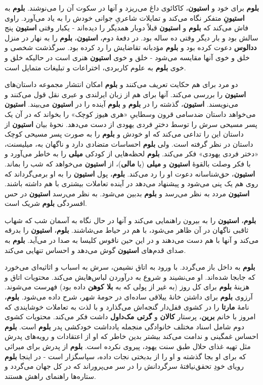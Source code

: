 \documentclass[12pt]{book}
\newcommand{\noun}[1]{{\textbf{#1}}}
\begin{document}
    \noun{بلوم} برای خود و \noun{استیون}، کاکائوی داغ می‌ریزد و آنها در سکوت آن را می‌نوشند. \noun{بلوم} به \noun{استیونِ} متفکر نگاه می‌کند و تمایلات شاعریِ جوانی خودش را به یاد می‌آورد. راوی فاش می‌کند که \noun{بلوم} و \noun{استیون} قبلاً دوبار همدیگر را دیده‌اند - یکبار وقتی \noun{استیون} پنج سالش بود و بار دیگر وقتی ده ساله بود. در دفعهٔ دوم، \noun{استیون}، \noun{بلوم} را به نهار در منزل \noun{ددالوس} دعوت کرده بود و \noun{بلوم} مؤدبانه تقاضایش را رد کرده بود. سرگذشت شخصی و خلق و خوی آنها مقایسه می‌شود - خلق و خوی \noun{استیون} هنری است در حالیکه خلق و خوی \noun{بلوم} به علوم کاربردی، اختراعات و تبلیغات متمایل است.

    دو مرد برای هم حکایت تعریف می‌کنند و \noun{بلوم} امکان انتشار مجموعه داستان‌های \noun{استیون} را بررسی می‌کند. آنها برای هم از زبان ایرلندی و عبری نقل قول می‌کنند و می‌نویسند. \noun{استیون}، گذشته را در \noun{بلوم} و \noun{بلوم} آینده را در \noun{استیون} می‌بیند. \noun{استیون} می‌خواهد داستان ضدسامی قرون وسطاییِ «هری هیوز کوچک» را بخواند که در آن یک پسر مسیحی سرش را توسط دخترِ فردی یهودی از دست می‌دهد. نحوهٔ بیان \noun{استیون} از داستان این را تداعی می‌کند که او خودش و \noun{بلوم} را به صورت پسر مسیحی کوچک داستان در نظر گرفته است. ولی \noun{بلوم} احساسات متضادی دارد و ناگهان به، میلیسنت، «دختر فردی یهودی» فکر می‌کند. \noun{بلوم} لحظه‌هایی از کودکی \noun{میلی} را به خاطر می‌آورد و با فکر وصلت بالقوهٔ \noun{استیون} و \noun{میلی} (یا \noun{مالی})، از \noun{استیون} می‌خواهد که شب را بماند. \noun{استیون}، حق‌شناسانه دعوت او را رد می‌کند. \noun{بلوم}، پول \noun{استیون} را به او برمی‌گرداند که روی هم یک پنی می‌شود و پیشنهاد می‌دهد در آینده تعاملات بیشتری با هم داشته باشند. \noun{استیون} مردد به نظر می‌رسد و \noun{بلوم} بدبین می‌شود. به نظر می‌رسد \noun{استیون} در حس افسردگی \noun{بلوم} شریک است.

    \noun{بلوم}، \noun{استیون} را به بیرون راهنمایی می‌کند و آنها در حال نگاه به آسمان شب که شهاب ثاقبی ناگهان در آن ظاهر می‌شود، با هم در حیاط می‌شاشند. \noun{بلوم}، \noun{استیون} را بدرقه می‌کند و آنها با هم دست می‌دهند و در این حین ناقوس کلیسا به صدا در می‌آید. \noun{بلوم} به صدای قدم‌های \noun{استیون} گوش می‌دهد و احساس تنهایی می‌کند.

    \noun{بلوم} به داخل باز می‌گردد. با ورود به اتاق نشیمن، سرش به اسباب و اثاثیه‌ای می‌خورد که جابجا شده‌اند. او می‌نشیند و شروع به درآوردن لباس‌هایش می‌کند. محتویات اتاق و هزینهٔ \noun{بلوم} برای کل روز (به غیر از پولی که به \noun{بلا کوهن} داده بود) فهرست می‌شوند. آرزوی \noun{بلوم} برای داشتن خانهٔ ییلاقی ساده‌ای در حومهٔ شهر، شرح داده می‌شود. \noun{بلوم}، نامهٔ \noun{مارتا} را در کشوی قفل‌دار گنجه‌اش می‌گذارد و با لذت به تعاملات خوشایندی که امروز با خانم \noun{برین}، پرستار \noun{کالان} و \noun{گرتی مک‌داول‬} داشت فکر می‌کند. محتویات کشوی دوم شامل اسناد مختلف خانوادگی منجمله یادداشت خودکشی پدر \noun{بلوم} است. \noun{بلوم} احساس غمگینی و ندامت می‌کند بیشتر بدین خاطر که او از اعتقادات و رویه‌های پدرش مثل تهیه غذای حلال طبق سنت یهود، پیروی نکرده است. \noun{بلوم} از پدرش برای میراثی که برای او بجا گذشته و او را از بدبختی نجات داده، سپاسگزار است - در اینجا \noun{بلوم} رویای خودِ تحقق‌نیافتهٔ سرگردانش را در سر می‌پروراند که در کل جهان می‌گردد و ستاره‌ها راهنمای راهش هستند.
\end{document}
